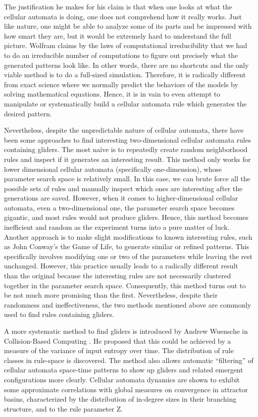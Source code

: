 \documentclass[12pt]{article}
\numberwithin{figure}{section} %
\begin{document}
The justification he makes for his claim is that when one looks at what the cellular automata is doing, one does not comprehend how it really works. Just like nature, one might be able to analyze some of its parts and be impressed with how smart they are, but it would be extremely hard to understand the full picture. Wolfram claims by the laws of computational irreducibility that we had to do an irreducible number of computations to figure out precisely what the generated patterns look like. In other words, there are no shortcuts and the only viable method is to do a full-sized simulation. Therefore, it is radically different from exact science where we normally predict the behaviors of the models by solving mathematical equations. Hence, it is in vain to even attempt to manipulate or systematically build a cellular automata rule which generates the desired pattern. 

Nevertheless, despite the unpredictable nature of cellular automata, there have been some approaches to find interesting two-dimensional cellular automata rules containing gliders. The most naïve is to repeatedly create random neighborhood rules and inspect if it generates an interesting result. This method only works for lower dimensional cellular automata (specifically one-dimension), whose parameter search space is relatively small. In this case, we can brute force all the possible sets of rules and manually inspect which ones are interesting after the generations are saved. However, when it comes to higher-dimensional cellular automata, even a two-dimensional one, the parameter search space becomes gigantic, and most rules would not produce gliders. Hence, this method becomes inefficient and random as the experiment turns into a pure matter of luck. Another approach is to make slight modifications to known interesting rules, such as John Conway’s the Game of Life, to generate similar or refined patterns. This specifically involves modifying one or two of the parameters while leaving the rest unchanged. However, this practice usually leads to a radically different result than the original because the interesting rules are not necessarily clustered together in the parameter search space. Consequently, this method turns out to be not much more promising than the first. Nevertheless, despite their randomness and ineffectiveness, the two methods mentioned above are commonly used to find rules containing gliders. 

A more systematic method to find gliders is introduced by Andrew Wuensche in Collision-Based Computing \cite{Finding Gliders in Cellular Automata}. He proposed that this could be achieved by a measure of the variance of input entropy over time. The distribution of rule classes in rule-space is discovered. The method also allows automatic “filtering” of cellular automata space-time patterns to show up gliders and related emergent configurations more clearly. Cellular automata dynamics are shown to exhibit some approximate correlations with global measures on convergence in attractor basins, characterized by the distribution of in-degree sizes in their branching structure, and to the rule parameter Z. 
\end{document}
